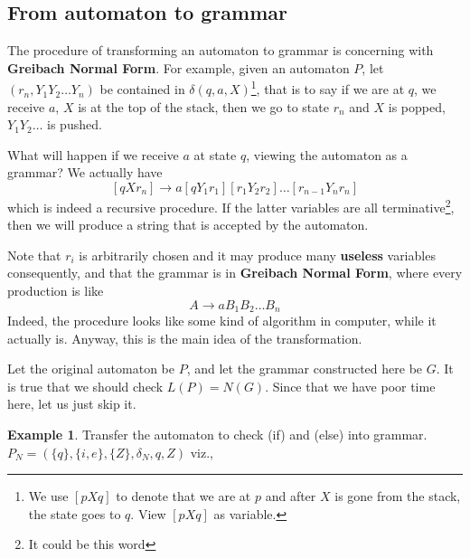 \documentclass[12pt]{article}
\theoremstyle{definition}
\newtheorem{exam}[definition]{Example}
\theoremstyle{remark}
\begin{document}
\subsection{From automaton to grammar}
The %
%
%
procedure of transforming an automaton to grammar is concerning with \textbf{Greibach Normal Form}. For example, given an automaton \(P\),
let \( (r_{n}, Y_1 Y_2 \dots Y_n)\) be contained in \(\delta ( q, a , X)\)\footnote{We use \( [ p  X q]\) to denote that we are at \(p\) and after \(X\) is gone from the 
stack, the state goes to \(q\). View \( [p X q]\) as variable.}, that is to say if we are at \(q\), we receive \(a\), \(X\) is at the top
of the stack, then we go to state \(r_{n}\) and \(X\) is popped, \(Y_1 Y_2 \dots\) is pushed. 

What will happen if we receive \(a\) at state \(q\), viewing the automaton as a grammar? We actually have 
\[ [q Xr_{n} ] \to a [q Y_1 r_{1}] [r_1 Y_2 r_2] \dots [r_{n-1} Y_{n} r_{n}]\] 
which is indeed a recursive procedure. If the latter variables are all terminative\footnote{It could be this word}, then we will produce a 
string that is accepted by the automaton. 

Note that \(r_{i}\) is arbitrarily chosen and it may produce many \textbf{useless} variables consequently, and that the grammar is in \textbf{Greibach Normal Form}, where every production is like 
\[
A \to a B_1 B_2 \dots B_n
\]
Indeed, the procedure looks like some kind of algorithm in computer, while it actually is. Anyway, this is the main idea 
of the transformation. 

Let the original automaton be \(P\), and let the grammar constructed here be \(G\). It is true that we should check 
\(L (P) = N (G)\). Since that  we have poor time here, let us just skip it.

\begin{exam}
	Transfer the automaton to check (if) and (else) into grammar. \(P_{N} = ( \{ q \} , \{ i, e\}, \{Z\},\delta _{N}, q ,Z)\) viz., 

\end{exam}
 
\end{document}
